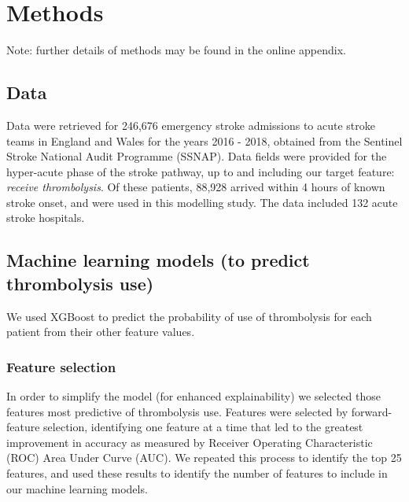 \renewcommand{\thefootnote}{\alph{footnote}} %

\section{Methods}

Note: further details of methods may be found in the online appendix. 


\subsection{Data}

Data were retrieved for 246,676 emergency stroke admissions to acute stroke teams in England and Wales for the years 2016 - 2018, obtained from the Sentinel Stroke National Audit Programme (SSNAP). Data fields were provided for the hyper-acute phase of the stroke pathway, up to and including our target feature: \emph{receive thrombolysis}. Of these patients, 88,928 arrived within 4 hours of known stroke onset, and were used in this modelling study. The data included 132 acute stroke hospitals.


\subsection{Machine learning models (to predict thrombolysis use)}

We used XGBoost \cite{chen_xgboost_2016} to predict the probability of use of thrombolysis for each patient from their other feature values.


\subsubsection{Feature selection}

In order to simplify the model (for enhanced explainability) we selected those features most predictive of thrombolysis use. Features were selected by forward-feature selection, identifying one feature at a time that led to the greatest improvement in accuracy as measured by Receiver Operating Characteristic (ROC) Area Under Curve (AUC). We repeated this process to identify the top 25 features, and used these results to identify the number of features to include in our machine learning models.

